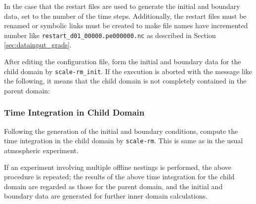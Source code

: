 In the case that the restart files are used to generate the initial and boundary data,
set  to the number of the time steps.
Additionally, the restart files must be renamed or symbolic links must be created to make file names have incremented number like \verb|restart_d01_00000.pe000000.nc| as described in Section \ref{sec:datainput_grads}.


After editing the configuration file, form the initial and boundary data for the child domain by \verb|scale-rm_init|.
If the execution is aborted with the message like the following, it means that the child domain is not completely contained in the parent domain:


\subsubsection{Time Integration in Child Domain}

Following the generation of the initial and boundary conditions, compute the time integration in the child domain by \verb|scale-rm|.
This is same as in the usual atmospheric experiment.

If an experiment involving multiple offline nestings is performed, the above procedure is repeated; the results of the above time integration for the child domain are regarded as those for the parent domain, and the initial and boundary data are generated for further inner domain calculations. 
